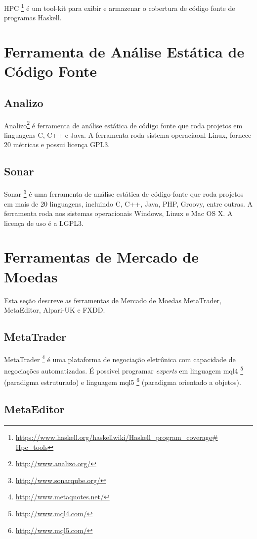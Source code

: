 HPC \footnote{\url{https://www.haskell.org/haskellwiki/Haskell_program_coverage\# Hpc_tools}} é um tool-kit para exibir e armazenar o cobertura de código fonte de programas Haskell.

\section{Ferramenta de Análise Estática de Código Fonte}

\subsection{Analizo}

Analizo\footnote{\url{ http://www.analizo.org/}}  é ferramenta de análise estática de código fonte que roda projetos em linguagens C, C++ e Java. A  ferramenta roda sistema operaciaonl Linux, fornece 20 métricas e possui licença GPL3.

\subsection{Sonar}

Sonar \footnote{\url{ http://www.sonarqube.org/}} é uma ferramenta de análise estática de código-fonte que roda projetos em mais de 20 linguagens, incluindo C, C++, Java, PHP, Groovy, entre outras. A ferramenta roda nos sistemas operacionais Windows, Linux e Mac OS X. A licença de uso é a LGPL3.

\section{Ferramentas de Mercado de Moedas}

Esta seção descreve as ferramentas de Mercado de Moedas MetaTrader, MetaEditor, Alpari-UK e FXDD.

\subsection{MetaTrader}

MetaTrader \footnote{\url{http://www.metaquotes.net/}} é uma plataforma de negociação eletrônica com capacidade de negociações automatizadas. É possível programar \textit{experts} em linguagem mql4 \footnote{\url{http://www.mql4.com/}} (paradigma estruturado)  e linguagem mql5 \footnote{\url{http://www.mql5.com/}} (paradigma orientado a objetos).

\subsection{MetaEditor}

